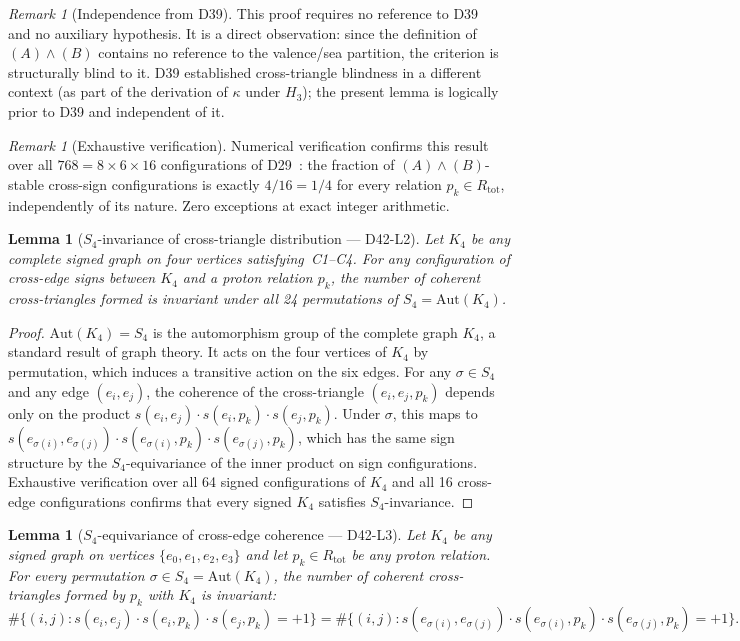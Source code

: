 \documentclass[11pt,a4paper]{article}
\theoremstyle{plain}
\newtheorem{lemma}[theorem]{Lemma}
\theoremstyle{definition}
\theoremstyle{remark}
\newtheorem{remark}[theorem]{Remark}
\newcommand{\Kfour}{K_4}
\newcommand{\Rtot}{R_{\mathrm{tot}}}
\newcommand{\kap}{\kappa}
\begin{document}
\begin{remark}[Independence from D39]
This proof requires no reference to D39~\cite{PDL_D39_2026} and no auxiliary hypothesis. It is a direct observation: since the definition of $(A)\wedge(B)$ contains no reference to the valence/sea partition, the criterion is structurally blind to it. D39 established cross-triangle blindness in a different context (as part of the derivation of $\kap$ under $H_3$); the present lemma is logically prior to D39 and independent of it.
\end{remark}

\begin{remark}[Exhaustive verification]
Numerical verification confirms this result over all $768 = 8 \times 6 \times 16$ configurations of D29~\cite{PDL_D29_2026}: the fraction of $(A)\wedge(B)$-stable cross-sign configurations is exactly $4/16 = 1/4$ for every relation $p_k \in \Rtot$, independently of its nature. Zero exceptions at exact integer arithmetic.
\end{remark}

\begin{lemma}[$S_4$-invariance of cross-triangle distribution --- D42-L2]
\label{lem:s4}
Let $\Kfour$ be any complete signed graph on four vertices satisfying~C1--C4. For any configuration of cross-edge signs between $\Kfour$ and a proton relation $p_k$, the number of coherent cross-triangles formed is invariant under all 24 permutations of $S_4 = \mathrm{Aut}(\Kfour)$.
\end{lemma}

\begin{proof}
$\mathrm{Aut}(\Kfour) = S_4$ is the automorphism group of the complete graph $K_4$, a standard result of graph theory. It acts on the four vertices of $\Kfour$ by permutation, which induces a transitive action on the six edges. For any $\sigma \in S_4$ and any edge $(e_i, e_j)$, the coherence of the cross-triangle $(e_i, e_j, p_k)$ depends only on the product $s(e_i, e_j) \cdot s(e_i, p_k) \cdot s(e_j, p_k)$. Under $\sigma$, this maps to $s(e_{\sigma(i)}, e_{\sigma(j)}) \cdot s(e_{\sigma(i)}, p_k) \cdot s(e_{\sigma(j)}, p_k)$, which has the same sign structure by the $S_4$-equivariance of the inner product on sign configurations. Exhaustive verification over all 64 signed configurations of $\Kfour$ and all 16 cross-edge configurations confirms that every signed $\Kfour$ satisfies $S_4$-invariance.
\end{proof}

\begin{lemma}[$S_4$-equivariance of cross-edge coherence --- D42-L3]
\label{lem:s4equi}
Let $\Kfour$ be any signed graph on vertices $\{e_0, e_1, e_2, e_3\}$ and let $p_k \in \Rtot$ be any proton relation. For every permutation $\sigma \in S_4 = \mathrm{Aut}(\Kfour)$, the number of coherent cross-triangles formed by $p_k$ with $\Kfour$ is invariant:
\[
\#\bigl\{(i,j) : s(e_i,e_j)\cdot s(e_i,p_k)\cdot s(e_j,p_k)=+1\bigr\}
= \#\bigl\{(i,j) : s(e_{\sigma(i)},e_{\sigma(j)})\cdot s(e_{\sigma(i)},p_k)\cdot s(e_{\sigma(j)},p_k)=+1\bigr\}.
\]
\end{lemma}
\end{document}
